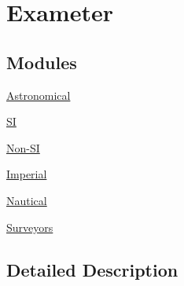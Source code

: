\hypertarget{group___e_g_x_math-_conversions-_length_conversions-_s_i-_exameter}{}\section{Exameter}
\label{group___e_g_x_math-_conversions-_length_conversions-_s_i-_exameter}
\subsection*{Modules}
\begin{DoxyCompactItemize}
\item 
\mbox{\hyperlink{group___e_g_x_math-_conversions-_length_conversions-_s_i-_exameter-_astronomical}{Astronomical}}
\item 
\mbox{\hyperlink{group___e_g_x_math-_conversions-_length_conversions-_s_i-_exameter-_s_i}{SI}}
\item 
\mbox{\hyperlink{group___e_g_x_math-_conversions-_length_conversions-_s_i-_exameter-_non-_s_i}{Non-\/\+SI}}
\item 
\mbox{\hyperlink{group___e_g_x_math-_conversions-_length_conversions-_s_i-_exameter-_imperial}{Imperial}}
\item 
\mbox{\hyperlink{group___e_g_x_math-_conversions-_length_conversions-_s_i-_exameter-_nautical}{Nautical}}
\item 
\mbox{\hyperlink{group___e_g_x_math-_conversions-_length_conversions-_s_i-_exameter-_surveyors}{Surveyors}}
\end{DoxyCompactItemize}


\subsection{Detailed Description}
